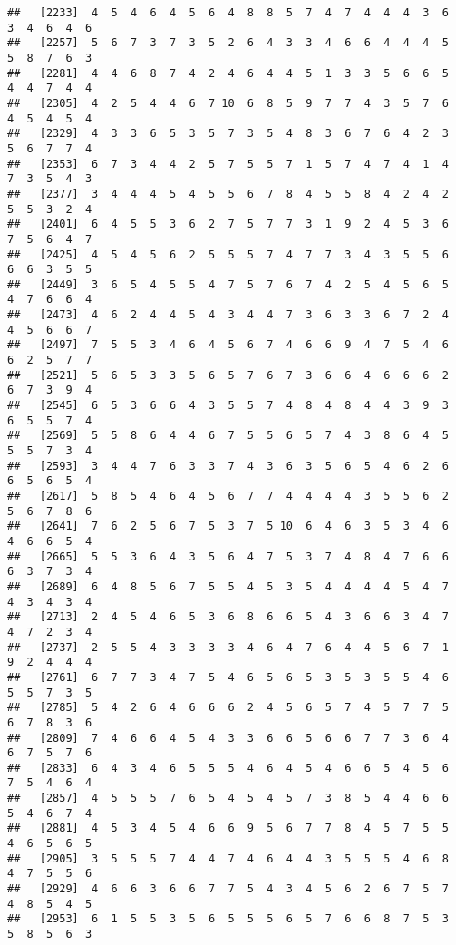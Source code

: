 \documentclass[
]{book}
\begin{document}
\begin{verbatim}
##   [2233]  4  5  4  6  4  5  6  4  8  8  5  7  4  7  4  4  4  3  6  3  4  6  4  6
##   [2257]  5  6  7  3  7  3  5  2  6  4  3  3  4  6  6  4  4  4  5  5  8  7  6  3
##   [2281]  4  4  6  8  7  4  2  4  6  4  4  5  1  3  3  5  6  6  5  4  4  7  4  4
##   [2305]  4  2  5  4  4  6  7 10  6  8  5  9  7  7  4  3  5  7  6  4  5  4  5  4
##   [2329]  4  3  3  6  5  3  5  7  3  5  4  8  3  6  7  6  4  2  3  5  6  7  7  4
##   [2353]  6  7  3  4  4  2  5  7  5  5  7  1  5  7  4  7  4  1  4  7  3  5  4  3
##   [2377]  3  4  4  4  5  4  5  5  6  7  8  4  5  5  8  4  2  4  2  5  5  3  2  4
##   [2401]  6  4  5  5  3  6  2  7  5  7  7  3  1  9  2  4  5  3  6  7  5  6  4  7
##   [2425]  4  5  4  5  6  2  5  5  5  7  4  7  7  3  4  3  5  5  6  6  6  3  5  5
##   [2449]  3  6  5  4  5  5  4  7  5  7  6  7  4  2  5  4  5  6  5  4  7  6  6  4
##   [2473]  4  6  2  4  4  5  4  3  4  4  7  3  6  3  3  6  7  2  4  4  5  6  6  7
##   [2497]  7  5  5  3  4  6  4  5  6  7  4  6  6  9  4  7  5  4  6  6  2  5  7  7
##   [2521]  5  6  5  3  3  5  6  5  7  6  7  3  6  6  4  6  6  6  2  6  7  3  9  4
##   [2545]  6  5  3  6  6  4  3  5  5  7  4  8  4  8  4  4  3  9  3  6  5  5  7  4
##   [2569]  5  5  8  6  4  4  6  7  5  5  6  5  7  4  3  8  6  4  5  5  5  7  3  4
##   [2593]  3  4  4  7  6  3  3  7  4  3  6  3  5  6  5  4  6  2  6  6  5  6  5  4
##   [2617]  5  8  5  4  6  4  5  6  7  7  4  4  4  4  3  5  5  6  2  5  6  7  8  6
##   [2641]  7  6  2  5  6  7  5  3  7  5 10  6  4  6  3  5  3  4  6  4  6  6  5  4
##   [2665]  5  5  3  6  4  3  5  6  4  7  5  3  7  4  8  4  7  6  6  6  3  7  3  4
##   [2689]  6  4  8  5  6  7  5  5  4  5  3  5  4  4  4  4  5  4  7  4  3  4  3  4
##   [2713]  2  4  5  4  6  5  3  6  8  6  6  5  4  3  6  6  3  4  7  4  7  2  3  4
##   [2737]  2  5  5  4  3  3  3  3  4  6  4  7  6  4  4  5  6  7  1  9  2  4  4  4
##   [2761]  6  7  7  3  4  7  5  4  6  5  6  5  3  5  3  5  5  4  6  5  5  7  3  5
##   [2785]  5  4  2  6  4  6  6  6  2  4  5  6  5  7  4  5  7  7  5  6  7  8  3  6
##   [2809]  7  4  6  6  4  5  4  3  3  6  6  5  6  6  7  7  3  6  4  6  7  5  7  6
##   [2833]  6  4  3  4  6  5  5  5  4  6  4  5  4  6  6  5  4  5  6  7  5  4  6  4
##   [2857]  4  5  5  5  7  6  5  4  5  4  5  7  3  8  5  4  4  6  6  5  4  6  7  4
##   [2881]  4  5  3  4  5  4  6  6  9  5  6  7  7  8  4  5  7  5  5  4  6  5  6  5
##   [2905]  3  5  5  5  7  4  4  7  4  6  4  4  3  5  5  5  4  6  8  4  7  5  5  6
##   [2929]  4  6  6  3  6  6  7  7  5  4  3  4  5  6  2  6  7  5  7  4  8  5  4  5
##   [2953]  6  1  5  5  3  5  6  5  5  5  6  5  7  6  6  8  7  5  3  5  8  5  6  3

\end{verbatim}
\end{document}
